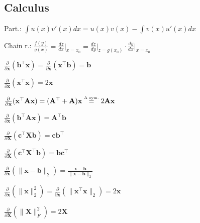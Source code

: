 \subsection*{Calculus}
\begin{inparaitem}[\color{red}\textbullet]
	\item Part.: $\int u(x)v'(x) dx = u(x)v(x) - \int v(x)u'(x) dx$\\
	\item Chain r.: $\frac{f(y)}{g(x)} = \frac{dz}{dx} \Big|_{x=x_0}= \frac{dz}{dy}\Big|_{z=g(x_0)}\cdot \frac{dy}{dx} \Big|_{x=x_0}$ \\
	\item $\frac{\partial}{\partial \mathbf{x}}(\mathbf{b}^\top \mathbf{x}) = \frac{\partial}{\partial \mathbf{x}}(\mathbf{x}^\top \mathbf{b}) = \mathbf{b}$
	\item $\frac{\partial}{\partial \mathbf{x}}(\mathbf{x}^\top \mathbf{x}) = 2\mathbf{x}$ \\
	\item $\frac{\partial}{\partial \mathbf{x}}(\mathbf{x}^\top \mathbf{A}\mathbf{x}) = (\mathbf{A}^\top + \mathbf{A})\mathbf{x} \stackrel{\text{\tiny A sym.}}{=} 2\mathbf{A}\mathbf{x}$ \\
	\item $\frac{\partial}{\partial \mathbf{x}}(\mathbf{b}^\top \mathbf{A}\mathbf{x}) = \mathbf{A}^\top \mathbf{b}$
	\item $\frac{\partial}{\partial \mathbf{X}}(\mathbf{c}^\top \mathbf{X} \mathbf{b}) = \mathbf{c}\mathbf{b}^\top$ \\
	\item $\frac{\partial}{\partial \mathbf{X}}(\mathbf{c}^\top \mathbf{X}^\top \mathbf{b}) = \mathbf{b}\mathbf{c}^\top$
	\item $\frac{\partial}{\partial \mathbf{x}}(\| \mathbf{x}-\mathbf{b} \|_2) = \frac{\mathbf{x}-\mathbf{b}}{\|\mathbf{x}-\mathbf{b}\|_2}$ \\
	\item $\frac{\partial}{\partial \mathbf{x}}(\|\mathbf{x}\|^2_2) = \frac{\partial}{\partial \mathbf{x}} (\|\mathbf{x}^\top \mathbf{x}\|_2) = 2\mathbf{x}$
	\item $\frac{\partial}{\partial \mathbf{X}}(\|\mathbf{X}\|_F^2) = 2\mathbf{X}$ \\

\end{inparaitem}
